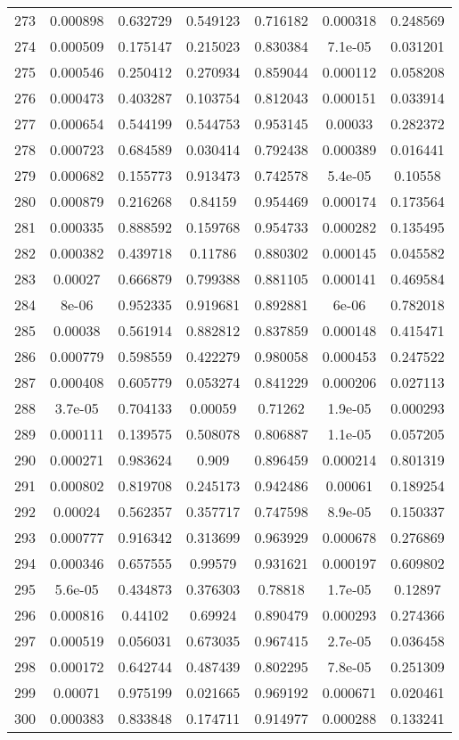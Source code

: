 \begin{table}
\begin{tabular}{c|c|c|c|c|c|c}
273 & 0.000898 & 0.632729 & 0.549123 & 0.716182 & 0.000318 & 0.248569\\
274 & 0.000509 & 0.175147 & 0.215023 & 0.830384 & 7.1e-05 & 0.031201\\
275 & 0.000546 & 0.250412 & 0.270934 & 0.859044 & 0.000112 & 0.058208\\
276 & 0.000473 & 0.403287 & 0.103754 & 0.812043 & 0.000151 & 0.033914\\
277 & 0.000654 & 0.544199 & 0.544753 & 0.953145 & 0.00033 & 0.282372\\
278 & 0.000723 & 0.684589 & 0.030414 & 0.792438 & 0.000389 & 0.016441\\
279 & 0.000682 & 0.155773 & 0.913473 & 0.742578 & 5.4e-05 & 0.10558\\
280 & 0.000879 & 0.216268 & 0.84159 & 0.954469 & 0.000174 & 0.173564\\
281 & 0.000335 & 0.888592 & 0.159768 & 0.954733 & 0.000282 & 0.135495\\
282 & 0.000382 & 0.439718 & 0.11786 & 0.880302 & 0.000145 & 0.045582\\
283 & 0.00027 & 0.666879 & 0.799388 & 0.881105 & 0.000141 & 0.469584\\
284 & 8e-06 & 0.952335 & 0.919681 & 0.892881 & 6e-06 & 0.782018\\
285 & 0.00038 & 0.561914 & 0.882812 & 0.837859 & 0.000148 & 0.415471\\
286 & 0.000779 & 0.598559 & 0.422279 & 0.980058 & 0.000453 & 0.247522\\
287 & 0.000408 & 0.605779 & 0.053274 & 0.841229 & 0.000206 & 0.027113\\
288 & 3.7e-05 & 0.704133 & 0.00059 & 0.71262 & 1.9e-05 & 0.000293\\
289 & 0.000111 & 0.139575 & 0.508078 & 0.806887 & 1.1e-05 & 0.057205\\
290 & 0.000271 & 0.983624 & 0.909 & 0.896459 & 0.000214 & 0.801319\\
291 & 0.000802 & 0.819708 & 0.245173 & 0.942486 & 0.00061 & 0.189254\\
292 & 0.00024 & 0.562357 & 0.357717 & 0.747598 & 8.9e-05 & 0.150337\\
293 & 0.000777 & 0.916342 & 0.313699 & 0.963929 & 0.000678 & 0.276869\\
294 & 0.000346 & 0.657555 & 0.99579 & 0.931621 & 0.000197 & 0.609802\\
295 & 5.6e-05 & 0.434873 & 0.376303 & 0.78818 & 1.7e-05 & 0.12897\\
296 & 0.000816 & 0.44102 & 0.69924 & 0.890479 & 0.000293 & 0.274366\\
297 & 0.000519 & 0.056031 & 0.673035 & 0.967415 & 2.7e-05 & 0.036458\\
298 & 0.000172 & 0.642744 & 0.487439 & 0.802295 & 7.8e-05 & 0.251309\\
299 & 0.00071 & 0.975199 & 0.021665 & 0.969192 & 0.000671 & 0.020461\\
300 & 0.000383 & 0.833848 & 0.174711 & 0.914977 & 0.000288 & 0.133241\\
\end{tabular}
\end{table}
